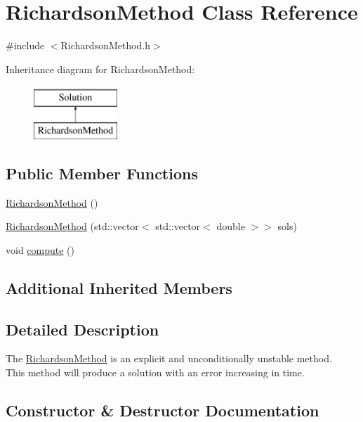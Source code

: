\hypertarget{class_richardson_method}{}\section{Richardson\+Method Class Reference}
\label{class_richardson_method}


{\ttfamily \#include $<$Richardson\+Method.\+h$>$}

Inheritance diagram for Richardson\+Method\+:\begin{figure}[H]
\begin{center}
\leavevmode
\includegraphics[height=2.000000cm]{class_richardson_method}
\end{center}
\end{figure}
\subsection*{Public Member Functions}
\begin{DoxyCompactItemize}
\item 
\hyperlink{class_richardson_method_a01c839ad5a09cd0e0a9e56ad8e43f980}{Richardson\+Method} ()
\item 
\hyperlink{class_richardson_method_a11cf699f84bdd051e16983096c6d4979}{Richardson\+Method} (std\+::vector$<$ std\+::vector$<$ double $>$$>$ sols)
\item 
void \hyperlink{class_richardson_method_acefe085864b041381f1a7fd3af46d7fb}{compute} ()
\end{DoxyCompactItemize}
\subsection*{Additional Inherited Members}


\subsection{Detailed Description}
The \hyperlink{class_richardson_method}{Richardson\+Method} is an explicit and unconditionally unstable method. ~\newline
 This method will produce a solution with an error increasing in time. 

\subsection{Constructor \& Destructor Documentation}
\mbox{\label{class_richardson_method_a01c839ad5a09cd0e0a9e56ad8e43f980}} 
